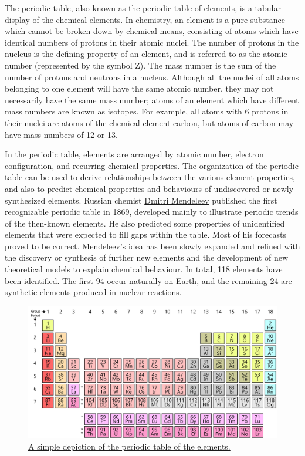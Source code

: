 The \href{https://en.wikipedia.org/wiki/Periodic_table}{periodic table},
also known as the periodic table of elements, is a tabular display of
the chemical elements. In chemistry, an element is a pure substance
which cannot be broken down by chemical means, consisting of atoms which
have identical numbers of protons in their atomic nuclei. The number of
protons in the nucleus is the defining property of an element, and is
referred to as the atomic number (represented by the symbol Z). The mass
number is the sum of the number of protons and neutrons in a nucleus.
Although all the nuclei of all atoms belonging to one element will have
the same atomic number, they may not necessarily have the same mass
number; atoms of an element which have different mass numbers are known
as isotopes. For example, all atoms with 6 protons in their nuclei are
atoms of the chemical element carbon, but atoms of carbon may have mass
numbers of 12 or 13.

In the periodic table, elements are arranged by atomic number, electron
configuration, and recurring chemical properties. The organization of
the periodic table can be used to derive relationships between the
various element properties, and also to predict chemical properties and
behaviours of undiscovered or newly synthesized elements. Russian
chemist \href{https://en.wikipedia.org/wiki/Dmitri_Mendeleev}{Dmitri
Mendeleev} published the first recognizable periodic table in 1869,
developed mainly to illustrate periodic trends of the then-known
elements. He also predicted some properties of unidentified elements
that were expected to fill gaps within the table. Most of his forecasts
proved to be correct. Mendeleev's idea has been slowly expanded and
refined with the discovery or synthesis of further new elements and the
development of new theoretical models to explain chemical behaviour. In
total, 118 elements have been identified. The first 94 occur naturally
on Earth, and the remaining 24 are synthetic elements produced in
nuclear reactions.

\begin{figure}

{\centering \includegraphics[width=0.7\linewidth]{./figures/chemistry/Simple_Periodic_Table_Chart-en} 

}

\caption{\href{https://commons.wikimedia.org/wiki/File:Simple_Periodic_Table_Chart-en.svg}{A simple depiction of the periodic table of the elements.}}\label{fig:periodictable}
\end{figure}

